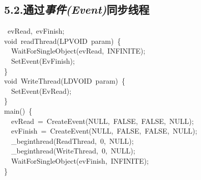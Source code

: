 \documentclass{article}
\begin{document}
\subsection{5.2.\hspace*{0.5em}通过\emph{事件(Event)}同步线程}\label{sec--event-}%
\begin{mdpre}%
~evRead,~evFinish;\\
{void}~readThread({LPVOID}~param)~\{\\
~~{WaitForSingleObject}(evRead,~{INFINITE});\\
~~{SetEvent}({EvFinish});\\
\}\\
{void}~{WriteThread}({LDVOID}~param)~\{\\
~~{SetEvent}({EvRead});\\
\}\\
main()~\{\\
~~evRead~=~{CreateEvent}({NULL},~{FALSE},~{FALSE},~{NULL});\\
~~evFinish~=~{CreateEvent}({NULL},~{FALSE},~{FALSE},~{NULL});\\
~~\_beginthread({ReadThread},~{0},~{NULL});\\
~~\_beginthread({WriteThread},~{0},~{NULL});\\
~~{WaitForSingleObject}(evFinish,~{INFINITE});\\
\}%
\end{mdpre}
\end{document}
